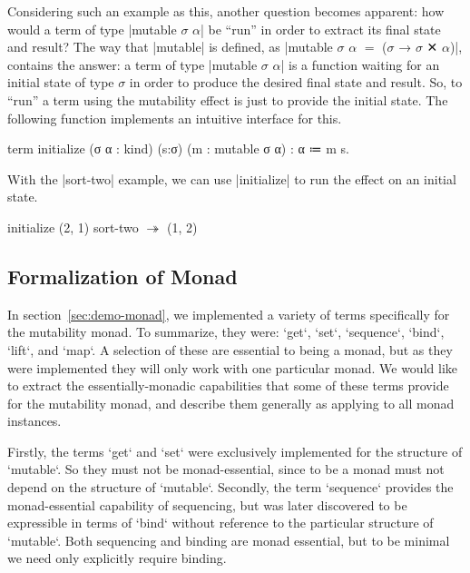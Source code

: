 Considering such an example as this, another question becomes apparent: how would a term of type \code|mutable $σ$ $α$| be ``run'' in order to extract its final state and result?
The way that \code|mutable| is defined, as \code|mutable $σ$ $α$ $=$ ($σ$ → $σ$ ✕ $α$)|, contains the answer: a term of type \code|mutable $σ$ $α$| is a function waiting for an initial state of type $σ$ in order to produce the desired final state and result.
So, to ``run'' a term using the mutability effect is just to provide the initial state.
The following function implements an intuitive interface for this.
%
\begin{program}
term initialize (σ α : kind) (s:σ) (m : mutable σ α) : α
  ≔ m s.
\end{program}
%
With the \code|sort-two| example, we can use \code|initialize| to run the effect on an initial state.
%
\begin{snippet}
initialize (2, 1) sort-two   $↠$   (1, 2)
\end{snippet}


\subsection{Formalization of Monad}
\label{sec:formalization-of-monad}

In section~\ref{sec:demo-monad}, we implemented a variety of terms specifically for the mutability monad.
To summarize, they were:
\code`get`, \code`set`, \code`sequence`, \code`bind`, \code`lift`, and \code`map`.
A selection of these are essential to being a monad,
but as they were implemented they will only work with one particular monad.
We would like to extract the essentially-monadic capabilities that some of these terms provide for the mutability monad, and describe them generally as applying to all monad instances.

Firstly, the terms \code`get` and \code`set` were exclusively implemented for the structure of \code`mutable`.
So they must not be monad-essential, since to be a monad must not depend on the structure of \code`mutable`.
Secondly, the term \code`sequence` provides the monad-essential capability of sequencing, but was later discovered to be expressible in terms of \code`bind` without reference to the particular structure of \code`mutable`.
Both sequencing and binding are monad essential, but to be minimal we need only explicitly require binding.

